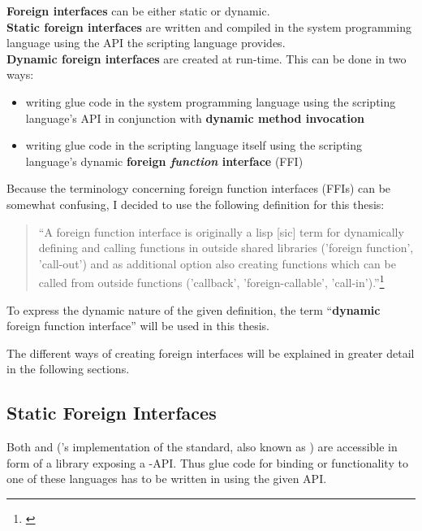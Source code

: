 \textbf{Foreign interfaces} can be either static or dynamic.\\
\textbf{Static foreign interfaces} are written and compiled in the system programming language using the API the scripting language provides.\\
\textbf{Dynamic foreign interfaces} are created at run-time. This can be done in two ways:
\begin{itemize}
\item writing glue code in the system programming language using the scripting language's API in conjunction with \textbf{dynamic method invocation}
\item writing glue code in the scripting language itself using the scripting language's dynamic \textbf{foreign \textit{function} interface} (FFI)
\end{itemize}

Because the terminology concerning foreign function interfaces (FFIs) can be somewhat confusing, I decided to use the following definition for this thesis:

\begin{quotation}
``A foreign function interface is originally a lisp [sic] term for dynamically defining and calling functions in outside shared libraries ('foreign function', 'call-out') and as additional option also creating functions which can be called from outside functions ('callback', 'foreign-callable', 'call-in').''\footnote{\citep{DesignFFI}}
\end{quotation}

To express the dynamic nature of the given definition, the term ``\textbf{dynamic} foreign function interface'' will be used in this thesis.

The different ways of creating foreign interfaces will be explained in greater detail in the following sections.

\subsection{Static Foreign Interfaces}

Both  and  ('s implementation of the  standard, also known as ) are accessible in form of a library exposing a -API. Thus glue code for binding  or  functionality to one of these languages has to be written in  using the given API.

